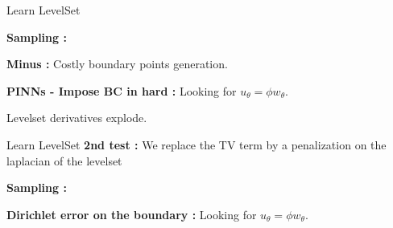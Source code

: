 \begin{frame}{Learn LevelSet }	
	\begin{minipage}{0.26\linewidth}
		\textbf{Sampling :}
		\begin{center}
		\end{center}
	\end{minipage} \quad \begin{minipage}{0.70\linewidth}
		\centering
		
		\footnotesize\flushleft\vspace{-10pt}
		\qquad\qquad \textbf{Minus :} Costly boundary points generation.
	\end{minipage}
	
	\vspace{10pt}
	
	\textbf{PINNs - Impose BC in hard :} Looking for $u_\theta=\phi w_\theta$.
	\begin{center}
	\end{center}
	
	\vspace{-10pt}
	Levelset derivatives explode.
\end{frame}

\begin{frame}{Learn LevelSet }
	\textbf{2nd test :} We replace the TV term by a penalization on the laplacian of the levelset

	\begin{center}
	\end{center}

	\begin{minipage}{0.28\linewidth}
		\centering
		\textbf{Sampling :}
		
	\end{minipage} \quad \begin{minipage}{0.68\linewidth}
		\centering
		\textbf{Dirichlet error on the boundary :} Looking for $u_\theta=\phi w_\theta$.
		
	\end{minipage}


\end{frame}

